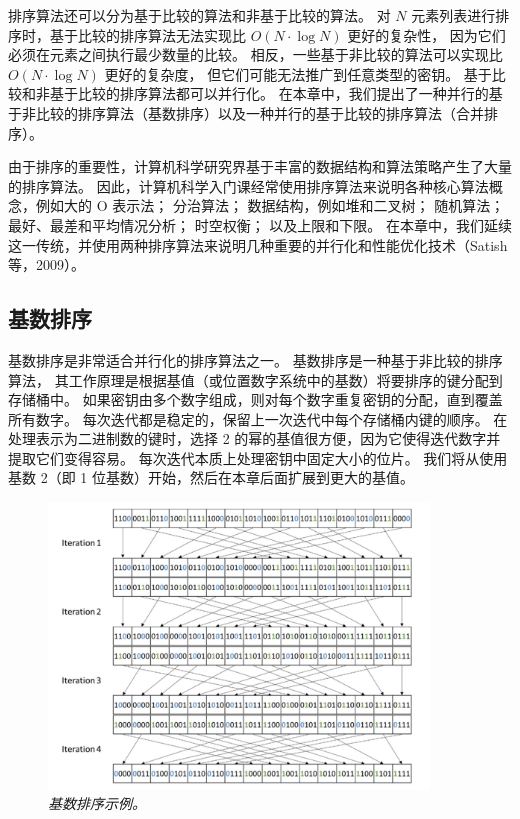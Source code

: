 排序算法还可以分为基于比较的算法和非基于比较的算法。 
对 $N$ 元素列表进行排序时，基于比较的排序算法无法实现比 $O(N \cdot \log N)$ 更好的复杂性，
因为它们必须在元素之间执行最少数量的比较。 相反，一些基于非比较的算法可以实现比 $O(N \cdot \log N)$ 更好的复杂度，
但它们可能无法推广到任意类型的密钥。 基于比较和非基于比较的排序算法都可以并行化。 
在本章中，我们提出了一种并行的基于非比较的排序算法（基数排序）以及一种并行的基于比较的排序算法（合并排序）。

由于排序的重要性，计算机科学研究界基于丰富的数据结构和算法策略产生了大量的排序算法。 
因此，计算机科学入门课经常使用排序算法来说明各种核心算法概念，例如大的 $\mathrm{O}$ 表示法； 
分治算法； 数据结构，例如堆和二叉树； 随机算法； 最好、最差和平均情况分析； 时空权衡； 以及上限和下限。 
在本章中，我们延续这一传统，并使用两种排序算法来说明几种重要的并行化和性能优化技术（Satish 等，2009）。

\subsection{基数排序}
基数排序是非常适合并行化的排序算法之一。 基数排序是一种基于非比较的排序算法，
其工作原理是根据基值（或位置数字系统中的基数）将要排序的键分配到存储桶中。 
如果密钥由多个数字组成，则对每个数字重复密钥的分配，直到覆盖所有数字。 
每次迭代都是稳定的，保留上一次迭代中每个存储桶内键的顺序。 
在处理表示为二进制数的键时，选择 2 的幂的基值很方便，因为它使得迭代数字并提取它们变得容易。 
每次迭代本质上处理密钥中固定大小的位片。 我们将从使用基数 2（即 1 位基数）开始，然后在本章后面扩展到更大的基值。

\begin{figure}[H]
	\centering
	\includegraphics[width=0.9\textwidth]{figs/F13.1.png}
	\caption{\textit{基数排序示例。}}
\end{figure}

